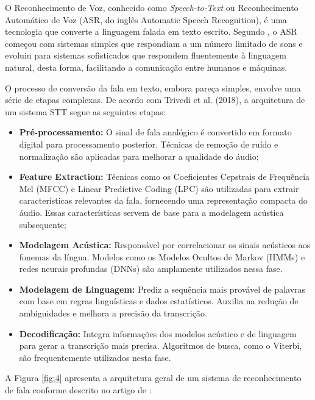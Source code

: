 O Reconhecimento de Voz, conhecido como \textit{Speech-to-Text} ou Reconhecimento Automático de Voz (ASR, do inglês Automatic Speech Recognition), é uma tecnologia que converte a linguagem falada em texto escrito. Segundo , o ASR começou com sistemas simples que respondiam a um número limitado de sons e evoluiu para sistemas sofisticados que respondem fluentemente à linguagem natural, desta forma, facilitando a comunicação entre humanos e máquinas.

O processo de conversão da fala em texto, embora pareça simples,  envolve uma série de etapas complexas. De acordo com Trivedi et al. (2018), a arquitetura de um sistema STT segue as seguintes etapas:

\begin{itemize}
    \item \textbf{Pré-processamento:} O sinal de fala analógico é convertido em formato digital para processamento posterior. Técnicas de remoção de ruído e normalização são aplicadas para melhorar a qualidade do áudio;
    \item \textbf{Feature Extraction:} Técnicas como os Coeficientes Cepstrais de Frequência Mel (MFCC) e Linear Predictive Coding (LPC) são utilizadas para extrair características relevantes da fala, fornecendo uma representação compacta do áudio. Essas características servem de base para a modelagem acústica subsequente;
    \item \textbf{Modelagem Acústica:} Responsável por correlacionar os sinais acústicos aos fonemas da língua. Modelos como os Modelos Ocultos de Markov (HMMs) e redes neurais profundas (DNNs) são amplamente utilizados nessa fase.
    \item \textbf{Modelagem de Linguagem:} Prediz a sequência mais provável de palavras com base em regras linguísticas e dados estatísticos. Auxilia na redução de ambiguidades e melhora a precisão da transcrição.
    \item \textbf{Decodificação:} Integra informações dos modelos acústico e de linguagem para gerar a transcrição mais precisa. Algoritmos de busca, como o Viterbi, são frequentemente utilizados nesta fase.
\end{itemize}

A Figura \ref{fig:4} apresenta a arquitetura geral de um sistema de reconhecimento de fala conforme descrito no artigo de :

